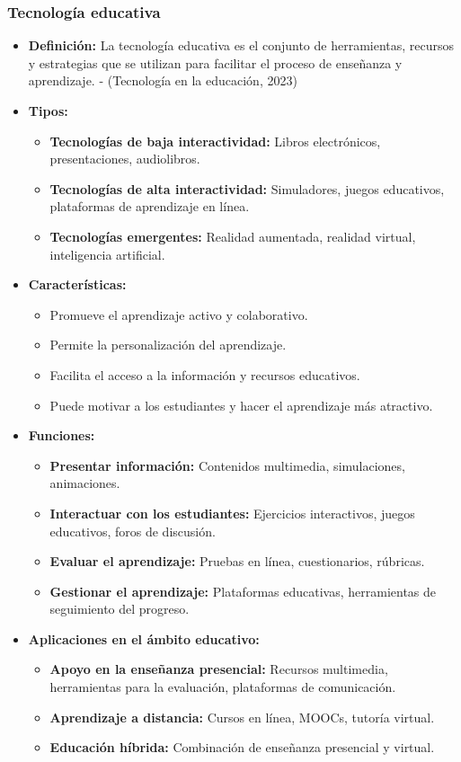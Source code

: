 \documentclass{article}
\begin{document}
\subsubsection{Tecnología educativa}
\begin{itemize}
  \item \textbf{Definición:} La tecnología educativa es el conjunto de herramientas, recursos y estrategias que se utilizan para facilitar el proceso de enseñanza y aprendizaje. \cite{Unesco} - (Tecnología en la educación, 2023)
  \item \textbf{Tipos: }
  \begin{itemize}
    \item \textbf{Tecnologías de baja interactividad: }Libros electrónicos, presentaciones, audiolibros.
    \item \textbf{Tecnologías de alta interactividad: }Simuladores, juegos educativos, plataformas de aprendizaje en línea.
    \item \textbf{Tecnologías emergentes: }Realidad aumentada, realidad virtual, inteligencia artificial.
  \end{itemize} 
  \item \textbf{Características:}
  \begin{itemize}
    \item Promueve el aprendizaje activo y colaborativo.
    \item Permite la personalización del aprendizaje.
    \item Facilita el acceso a la información y recursos educativos.
    \item Puede motivar a los estudiantes y hacer el aprendizaje más atractivo.
  \end{itemize}
  \item \textbf{Funciones:}
  \begin{itemize}
    \item \textbf{Presentar información: }Contenidos multimedia, simulaciones, animaciones.
    \item \textbf{Interactuar con los estudiantes: }Ejercicios interactivos, juegos educativos, foros de discusión.
    \item \textbf{Evaluar el aprendizaje: }Pruebas en línea, cuestionarios, rúbricas.
    \item \textbf{Gestionar el aprendizaje: }Plataformas educativas, herramientas de seguimiento del progreso.
  \end{itemize}
  \item \textbf{Aplicaciones en el ámbito educativo:}
  \begin{itemize}
    \item \textbf{Apoyo en la enseñanza presencial: }Recursos multimedia, herramientas para la evaluación, plataformas de comunicación.
    \item \textbf{Aprendizaje a distancia: }Cursos en línea, MOOCs, tutoría virtual.
    \item \textbf{Educación híbrida: }Combinación de enseñanza presencial y virtual.
  \end{itemize}
\end{itemize}
\end{document}
